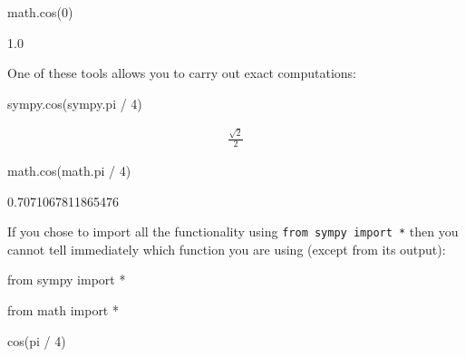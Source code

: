 \begin{pyin}
math.cos(0)
\end{pyin}





\begin{raw}
1.0
\end{raw}





One of these tools allows you to carry out exact computations:




\begin{pyin}
sympy.cos(sympy.pi / 4)
\end{pyin}




\begin{equation*}
\begin{split}\displaystyle \frac{\sqrt{2}}{2}\end{split}
\end{equation*}






\begin{pyin}
math.cos(math.pi / 4)
\end{pyin}


\begin{raw}
0.7071067811865476
\end{raw}





If you chose to import all the functionality using \texttt{from sympy import *}
then you
cannot tell immediately which function you are using (except from its output):




\begin{pyin}
from sympy import *
\end{pyin}







\begin{pyin}
from math import *
\end{pyin}







\begin{pyin}
cos(pi / 4)
\end{pyin}



